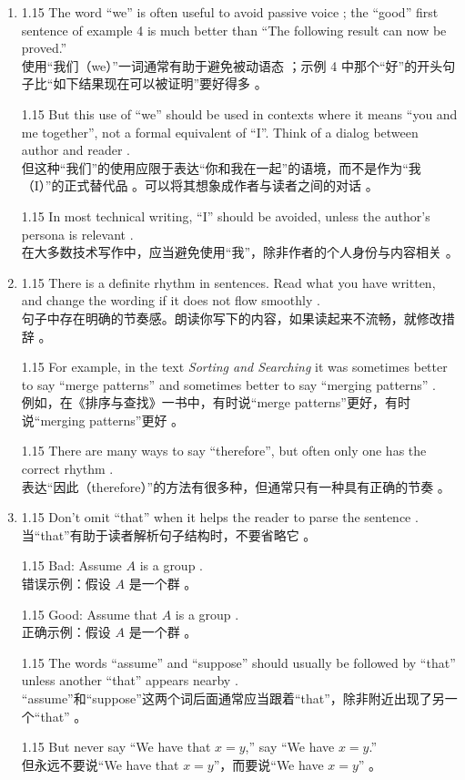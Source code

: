 \documentclass[12pt,a4paper]{article}
\newcommand{\bilingual}[2]{
    \begin{spacing}{1.15} %
        \noindent \normalsize #1 \\[-0.5ex] %
        \small \textcolor{blue!70!black}{#2} %
    \end{spacing}
    \vspace{0.8em} %
}
\begin{document}
\begin{enumerate}
\item \bilingual{The word ``we'' is often useful to avoid passive voice ; the ``good'' first sentence of example 4 is much better than ``The following result can now be proved.'' }{使用“我们（we）”一词通常有助于避免被动语态 ；示例 4 中那个“好”的开头句子比“如下结果现在可以被证明”要好得多 。}
\bilingual{But this use of ``we'' should be used in contexts where it means ``you and me together'', not a formal equivalent of ``I''. Think of a dialog between author and reader .}{但这种“我们”的使用应限于表达“你和我在一起”的语境，而不是作为“我（I）”的正式替代品 。可以将其想象成作者与读者之间的对话 。}
\bilingual{In most technical writing, ``I'' should be avoided, unless the author's persona is relevant .}{在大多数技术写作中，应当避免使用“我”，除非作者的个人身份与内容相关 。}

\item \bilingual{There is a definite rhythm in sentences. Read what you have written, and change the wording if it does not flow smoothly .}{句子中存在明确的节奏感。朗读你写下的内容，如果读起来不流畅，就修改措辞 。}
\bilingual{For example, in the text \textit{Sorting and Searching} it was sometimes better to say ``merge patterns'' and sometimes better to say ``merging patterns'' .}{例如，在《排序与查找》一书中，有时说“merge patterns”更好，有时说“merging patterns”更好 。}
\bilingual{There are many ways to say ``therefore'', but often only one has the correct rhythm .}{表达“因此（therefore）”的方法有很多种，但通常只有一种具有正确的节奏 。}

\item \bilingual{Don't omit ``that'' when it helps the reader to parse the sentence .}{当“that”有助于读者解析句子结构时，不要省略它 。}
\bilingual{Bad: Assume $A$ is a group .}{错误示例：假设 $A$ 是一个群 。}
\bilingual{Good: Assume that $A$ is a group .}{正确示例：假设 $A$ 是一个群 。}
\bilingual{The words ``assume'' and ``suppose'' should usually be followed by ``that'' unless another ``that'' appears nearby .}{“assume”和“suppose”这两个词后面通常应当跟着“that”，除非附近出现了另一个“that” 。}
\bilingual{But never say ``We have that $x=y$,'' say ``We have $x=y$.'' }{但永远不要说“We have that $x=y$”，而要说“We have $x=y$” 。}


\end{enumerate}
\end{document}
